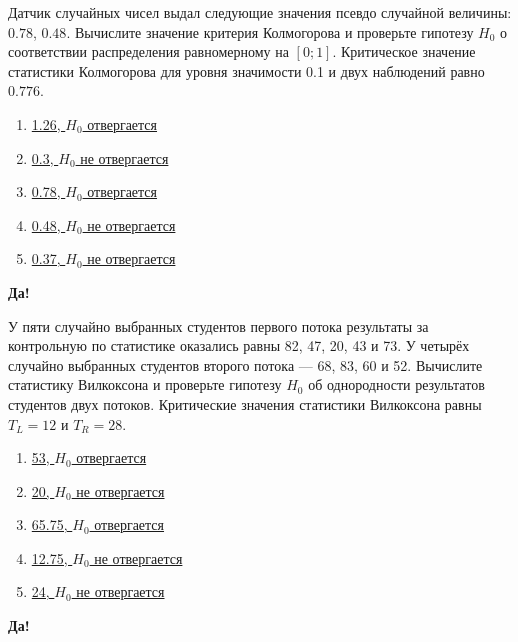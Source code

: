 \documentclass[t]{beamer}
\begin{document}
 \begin{frame} \label{60-Yes} 
\begin{block}{60} 

Датчик случайных чисел выдал следующие значения псевдо случайной величины: $0.78$, $0.48$. Вычислите значение критерия Колмогорова и проверьте гипотезу $H_0$ о соответствии распределения равномерному на $[0;1]$. Критическое значение статистики Колмогорова для уровня значимости 0.1 и двух наблюдений равно $0.776$.
 


 \end{block} 
\begin{enumerate} 
\item[] \hyperlink{60-No}{\beamergotobutton{} 1.26, $H_0$ отвергается}
\item[] \hyperlink{60-No}{\beamergotobutton{} 0.3, $H_0$ не отвергается}
\item[] \hyperlink{60-Yes}{\beamergotobutton{} 0.78, $H_0$ отвергается}
\item[] \hyperlink{60-No}{\beamergotobutton{} 0.48, $H_0$ не отвергается}
\item[] \hyperlink{60-No}{\beamergotobutton{} 0.37, $H_0$ не отвергается}
\end{enumerate} 

 \textbf{Да!} 
 \hyperlink{61}{}\end{frame} 


 \begin{frame} \label{61-Yes} 
\begin{block}{61} 

У пяти случайно выбранных студентов первого потока результаты за контрольную по статистике оказались равны  82, 47, 20, 43 и 73. У четырёх случайно выбранных студентов второго потока — 68, 83, 60 и 52. Вычислите статистику Вилкоксона и проверьте гипотезу $H_0$ об однородности результатов студентов двух потоков. Критические значения статистики Вилкоксона равны $T_L=12$ и $T_R=28$.
 


 \end{block} 
\begin{enumerate} 
\item[] \hyperlink{61-No}{\beamergotobutton{} 53, $H_0$ отвергается}
\item[] \hyperlink{61-No}{\beamergotobutton{} 20, $H_0$ не отвергается}
\item[] \hyperlink{61-No}{\beamergotobutton{} 65.75, $H_0$ отвергается}
\item[] \hyperlink{61-No}{\beamergotobutton{} 12.75, $H_0$ не отвергается}
\item[] \hyperlink{61-Yes}{\beamergotobutton{} 24, $H_0$ не отвергается}
\end{enumerate} 

 \textbf{Да!} 
 \hyperlink{62}{}\end{frame} 
\end{document}
